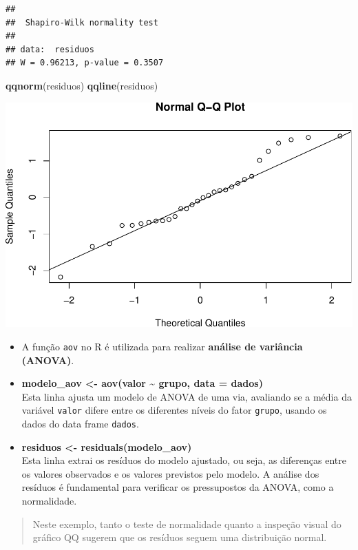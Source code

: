 \documentclass[
]{book}
\newenvironment{Shaded}{\begin{snugshade}}{\end{snugshade}}
\newcommand{\FunctionTok}[1]{\textcolor[rgb]{0.13,0.29,0.53}{\textbf{#1}}}
\newcommand{\NormalTok}[1]{#1}
\begin{document}
\begin{verbatim}
## 
##  Shapiro-Wilk normality test
## 
## data:  residuos
## W = 0.96213, p-value = 0.3507
\end{verbatim}

\begin{Shaded}
\begin{Highlighting}[]
\FunctionTok{qqnorm}\NormalTok{(residuos)}
\FunctionTok{qqline}\NormalTok{(residuos)}
\end{Highlighting}
\end{Shaded}

\includegraphics{LivroEstatisticaR_files/figure-latex/residuosAnovatest-1.pdf}

\begin{itemize}
\item
  A função \texttt{aov} no R é utilizada para realizar \textbf{análise de variância (ANOVA)}.
\item
  \textbf{modelo\_aov \textless- aov(valor \textasciitilde{} grupo, data = dados)}\\
  Esta linha ajusta um modelo de ANOVA de uma via, avaliando se a média da variável \texttt{valor} difere entre os diferentes níveis do fator \texttt{grupo}, usando os dados do data frame \texttt{dados}.
\item
  \textbf{residuos \textless- residuals(modelo\_aov)}\\
  Esta linha extrai os resíduos do modelo ajustado, ou seja, as diferenças entre os valores observados e os valores previstos pelo modelo. A análise dos resíduos é fundamental para verificar os pressupostos da ANOVA, como a normalidade.
\end{itemize}

\begin{quote}
Neste exemplo, tanto o teste de normalidade quanto a inspeção visual do gráfico QQ sugerem que os resíduos seguem uma distribuição normal.
\end{quote}
\end{document}
